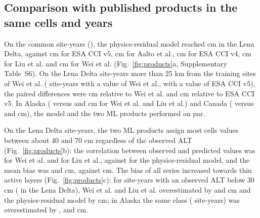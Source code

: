 \subsection{Comparison with published products in the same cells and years}
On the common site-years (\nyrscc), the physics-residual model reached \nccLeRoall{} cm in the Lena Delta, against \nccLeCcifiveall{} cm for ESA CCI v5, \nccLeAaltoall{} cm for Aalto et al., \nccLeCcifourall{} cm for ESA CCI v4, \nccLeLiuall{} cm for Liu et al. and \nccLeWeiall{} cm for Wei et al. (Fig.~\ref{fig:products}a, Supplementary Table~S6). On the Lena Delta site-years more than 25 km from the training sites of Wei et al. (\nnprodLeweimask{} site-years with a value of Wei et al., \nnprodLeccifivemask{} with a value of ESA CCI v5), the paired differences were \ndprodLeweiRomask{} cm relative to Wei et al. and \ndprodLeccifiveRomask{} cm relative to ESA CCI v5. In Alaska (\nccAkRoall{} versus \nccAkWeiall{} and \nccAkLiuall{} cm for Wei et al. and Liu et al.) and Canada (\nccCaRoall{} versus \nccCaWeiall{} and \nccCaLiuall{} cm), the model and the two ML products performed on par.

On the Lena Delta site-years, the two ML products assign most cells values between about 40 and 70 cm regardless of the observed ALT (Fig.~\ref{fig:products}b): the correlation between observed and predicted values was \nrLeWei{} for Wei et al. and \nrLeLiu{} for Liu et al., against \nrLeRo{} for the physics-residual model, and the mean bias was \nbiasLeAllWei{} and \nbiasLeAllLiu{} cm, against \nbiasLeAllRo{} cm. The bias of all series increased towards thin active layers (Fig.~\ref{fig:products}c): for site-years with an observed ALT below 30 cm (\nthinNLe{} in the Lena Delta), Wei et al. and Liu et al. overestimated by \nbiasLeThinWei{} and \nbiasLeThinLiu{} cm and the physics-residual model by \nbiasLeThinRo{} cm; in Alaska the same class (\nthinNAk{} site-years) was overestimated by \nbiasAkThinWei{}, \nbiasAkThinLiu{} and \nbiasAkThinRo{} cm.


